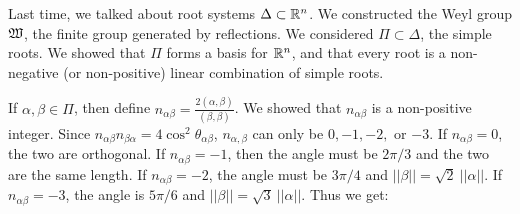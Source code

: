  \setcounter{lecture}{15}

 Last time, we talked about root systems $\Delta\subset \mathbb{R}^n$. We constructed the
 Weyl group $\mathfrak{W}$, the finite group generated by reflections. We considered $\Pi\subset
 \Delta$, the simple roots. We showed that $\Pi$ forms a basis for $\mathbb{R}^n$, and that every
 root is a non-negative (or non-positive) linear combination of simple roots.

 If $\alpha,\beta\in \Pi$, then define $n_{\alpha\beta} =
 \frac{2(\alpha,\beta)}{(\beta,\beta)}$. We showed that $n_{\alpha\beta}$ is a
 non-positive integer. Since $n_{\alpha\beta}n_{\beta\alpha} = 4\cos^2
 \theta_{\alpha\beta}$, $n_{\alpha,\beta}$ can only be $0,-1,-2,$ or $-3$. If
 $n_{\alpha\beta}=0$, the two are orthogonal. If $n_{\alpha\beta}=-1$, then the angle
 must be $2\pi/3$ and the two are the same length. If $n_{\alpha\beta}=-2$, the angle
 must be $3\pi/4$ and $||\beta||=\sqrt{2}\ ||\alpha||$. If $n_{\alpha\beta}=-3$, the
 angle is $5\pi/6$ and $||\beta||=\sqrt{3}\ ||\alpha||$. Thus we get:
